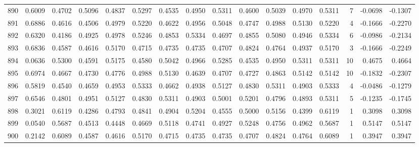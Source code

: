 \begin{tabular}{lrrrrrrrrrrrrrrr}
890 &      0.6009 &  0.4702 &  0.5096 &  0.4837 &  0.5297 &  0.4535 &  0.4950 &  0.5311 &  0.4600 &  0.5039 &   0.4970 &     0.5311 &      7 &                   -0.0698 &                    -0.1307 \\
891 &      0.6886 &  0.4616 &  0.4506 &  0.4979 &  0.5220 &  0.4622 &  0.4956 &  0.5048 &  0.4747 &  0.4988 &   0.5130 &     0.5220 &      4 &                   -0.1666 &                    -0.2270 \\
892 &      0.6320 &  0.4186 &  0.4925 &  0.4978 &  0.5246 &  0.4853 &  0.5334 &  0.4697 &  0.4855 &  0.5080 &   0.4946 &     0.5334 &      6 &                   -0.0986 &                    -0.2134 \\
893 &      0.6836 &  0.4587 &  0.4616 &  0.5170 &  0.4715 &  0.4735 &  0.4735 &  0.4707 &  0.4824 &  0.4764 &   0.4937 &     0.5170 &      3 &                   -0.1666 &                    -0.2249 \\
894 &      0.0636 &  0.5300 &  0.4591 &  0.5175 &  0.4580 &  0.5042 &  0.4966 &  0.5285 &  0.4535 &  0.4950 &   0.5311 &     0.5311 &     10 &                    0.4675 &                     0.4664 \\
895 &      0.6974 &  0.4667 &  0.4730 &  0.4776 &  0.4988 &  0.5130 &  0.4639 &  0.4707 &  0.4727 &  0.4863 &   0.5142 &     0.5142 &     10 &                   -0.1832 &                    -0.2307 \\
896 &      0.5819 &  0.4540 &  0.4659 &  0.4953 &  0.5333 &  0.4662 &  0.4938 &  0.5127 &  0.4830 &  0.5311 &   0.4903 &     0.5333 &      4 &                   -0.0486 &                    -0.1279 \\
897 &      0.6546 &  0.4801 &  0.4951 &  0.5127 &  0.4830 &  0.5311 &  0.4903 &  0.5001 &  0.5201 &  0.4796 &   0.4893 &     0.5311 &      5 &                   -0.1235 &                    -0.1745 \\
898 &      0.3021 &  0.6119 &  0.4286 &  0.4793 &  0.4841 &  0.4904 &  0.5204 &  0.4555 &  0.5000 &  0.5156 &   0.4399 &     0.6119 &      1 &                    0.3098 &                     0.3098 \\
899 &      0.0540 &  0.5687 &  0.4513 &  0.4448 &  0.4669 &  0.5118 &  0.4741 &  0.4927 &  0.5248 &  0.4756 &   0.4962 &     0.5687 &      1 &                    0.5147 &                     0.5147 \\
900 &      0.2142 &  0.6089 &  0.4587 &  0.4616 &  0.5170 &  0.4715 &  0.4735 &  0.4735 &  0.4707 &  0.4824 &   0.4764 &     0.6089 &      1 &                    0.3947 &                     0.3947 \\

\end{tabular}
